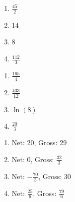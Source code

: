\documentclass{article}
\newcounter{key}
\begin{document}
\begin{multicols}{4}
\begin{enumerate}
    \item $\frac{45}{2}$
    \item 14
    \item 8
    \item $\frac{112}{3}$
\end{enumerate}     \setcounter{key}{\value{enumi}}
\end{multicols}
\begin{multicols}{4}
\begin{enumerate}   \setcounter{enumi}{\value{key}}
    \item $\frac{165}{4}$
    \item $\frac{433}{12}$
    \item $\ln(8)$
    \item $\frac{20}{3}$
\end{enumerate}     \setcounter{key}{\value{enumi}}
\end{multicols}
\begin{multicols}{4}
\begin{enumerate}   \setcounter{enumi}{\value{key}}
    \item Net: 20, Gross: 29
    \item Net: 0, Gross: $\frac{32}{3}$
    \item Net: $-\frac{70}{3}$, Gross: 30
    \item Net: $\frac{25}{6}$, Gross: $\frac{79}{6}$
\end{enumerate}     \setcounter{key}{\value{enumi}}
\end{multicols}
\end{document}
